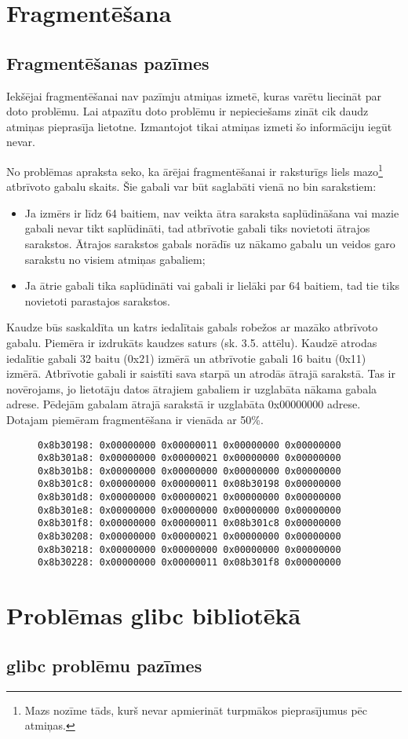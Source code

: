 \section{Fragmentēšana}





\subsection{Fragmentēšanas pazīmes}
Iekšējai fragmentēšanai nav pazīmju atmiņas izmetē, kuras varētu liecināt par doto problēmu.
Lai atpazītu doto problēmu ir nepieciešams zināt cik daudz atmiņas pieprasīja lietotne.
Izmantojot tikai atmiņas izmeti šo informāciju iegūt nevar.

No problēmas apraksta seko, ka ārējai fragmentēšanai ir raksturīgs liels mazo\footnote{Mazs nozīme tāds, kurš nevar apmierināt turpmākos pieprasījumus pēc atmiņas.} atbrīvoto gabalu skaits.
Šie gabali var būt saglabāti vienā no bin sarakstiem:
\begin{itemize}
\item Ja izmērs ir līdz 64 baitiem, nav veikta ātra saraksta saplūdināšana vai mazie gabali nevar tikt saplūdināti, tad atbrīvotie gabali tiks novietoti ātrajos sarakstos.
Ātrajos sarakstos gabals norādīs uz nākamo gabalu un veidos garo sarakstu no visiem atmiņas gabaliem;
\item Ja ātrie gabali tika saplūdināti vai gabali ir lielāki par 64 baitiem, tad tie tiks novietoti parastajos sarakstos.
\end{itemize}

Kaudze būs saskaldīta un katrs iedalītais gabals robežos ar mazāko atbrīvoto gabalu. 
Piemēra ir izdrukāts kaudzes saturs (sk. 3.5. attēlu).
Kaudzē atrodas iedalītie gabali 32 baitu (0x21) izmērā un atbrīvotie gabali 16 baitu (0x11) izmērā.
Atbrīvotie gabali ir saistīti sava starpā un atrodās ātrajā sarakstā.
Tas ir novērojams, jo lietotāju datos ātrajiem gabaliem ir uzglabāta nākama gabala adrese.
Pēdejām gabalam ātrajā sarakstā ir uzglabāta 0x00000000 adrese.
Dotajam piemēram fragmentēšana ir vienāda ar 50\%.

\begin{figure}[h]
\begin{lstlisting}[style=customgdb]
0x8b30198: 0x00000000 0x00000011 0x00000000 0x00000000
0x8b301a8: 0x00000000 0x00000021 0x00000000 0x00000000
0x8b301b8: 0x00000000 0x00000000 0x00000000 0x00000000
0x8b301c8: 0x00000000 0x00000011 0x08b30198 0x00000000
0x8b301d8: 0x00000000 0x00000021 0x00000000 0x00000000
0x8b301e8: 0x00000000 0x00000000 0x00000000 0x00000000
0x8b301f8: 0x00000000 0x00000011 0x08b301c8 0x00000000
0x8b30208: 0x00000000 0x00000021 0x00000000 0x00000000
0x8b30218: 0x00000000 0x00000000 0x00000000 0x00000000
0x8b30228: 0x00000000 0x00000011 0x08b301f8 0x00000000
\end{lstlisting}
\caption{\textbf{\fontsize{11}{12}\selectfont {Fragmentētā kaudze}}}
\end{figure}




\section{Problēmas glibc bibliotēkā}
\subsection{glibc problēmu pazīmes}
